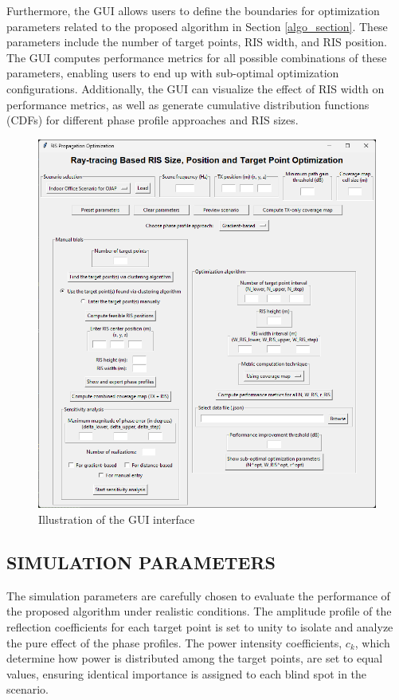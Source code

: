 \documentclass{IEEEoj}
\begin{document}
Furthermore, the GUI allows users to define the boundaries for optimization parameters related to the proposed algorithm in Section \ref{algo_section}. These parameters include the number of target points, RIS width, and RIS position. The GUI computes performance metrics for all possible combinations of these parameters, enabling users to end up with sub-optimal optimization configurations. Additionally, the GUI can visualize the effect of RIS width on performance metrics, as well as generate cumulative distribution functions (CDFs) for different phase profile approaches and RIS sizes.

\begin{figure}
	\centering \includegraphics[width=\linewidth]{Sim_Results/GUI.png}
	\caption{Illustration of the GUI interface}
	\label{GUI}
\end{figure}

\subsection{SIMULATION PARAMETERS}
The simulation parameters are carefully chosen to evaluate the performance of the proposed algorithm under realistic conditions. The amplitude profile of the reflection coefficients for each target point is set to unity to isolate and analyze the pure effect of the phase profiles. The power intensity coefficients, $c_k$, which determine how power is distributed among the target points, are set to equal values, ensuring identical importance is assigned to each blind spot in the scenario.
\end{document}
